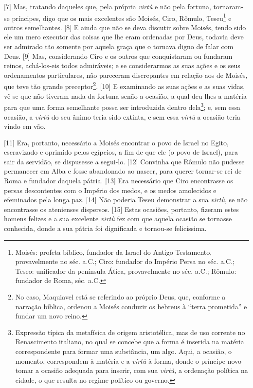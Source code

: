 {[}7{]} Mas, tratando daqueles que, pela própria \emph{virtù} e não pela
fortuna, tornaram- se príncipes, digo que os mais excelentes são Moisés,
Ciro, Rômulo, Teseu\footnote{Moisés: profeta bíblico, fundador da Israel
  do Antigo Testamento, provavelmente no séc.  a.C.; Ciro: fundador
  do Império Persa no séc.  a.C.; Teseo: unificador da península
  Ática, provavelmente no séc.  a.C.; Rômulo: fundador de Roma,
  séc. a.C.} e outros semelhantes. {[}8{]} E ainda que não se deva
discutir sobre Moisés, tendo sido ele um mero executor das coisas que
lhe eram ordenadas por Deus, todavia deve ser admirado tão somente por
aquela graça que o tornava digno de falar com Deus. {[}9{]} Mas,
considerando Ciro e os outros que conquistaram ou fundaram reinos,
achá-los-eis todos admiráveis; e se considerarmos as suas ações e os
seus ordenamentos particulares, não pareceram discrepantes em relação
aos de Moisés, que teve tão grande preceptor\footnote{No caso, Maquiavel
  está se referindo ao próprio Deus, que, conforme a narração bíblica,
  ordenou a Moisés conduzir os hebreus à ``terra prometida'' e fundar um
  novo reino.}. {[}10{]} E examinando as suas ações e as suas vidas,
vê-se que não tiveram nada da fortuna senão a ocasião, a qual deu-lhes a
matéria para que uma forma semelhante possa ser introduzida dentro
dela\footnote{Expressão típica da metafísica de origem aristotélica, mas
  de uso corrente no Renascimento italiano, no qual se concebe que a
  forma é inserida na matéria correspondente para formar uma substância,
  um algo. Aqui, a ocasião, o momento, correspondem à matéria e a
  \emph{virtù} à forma, donde o príncipe novo tomar a ocasião adequada
  para inserir, com sua \emph{virtù,} a ordenação política na cidade, o
  que resulta no regime político ou governo.}; e, sem essa ocasião, a
\emph{virtù} do seu ânimo teria sido extinta, e sem essa \emph{virtù} a
ocasião teria vindo em vão.

{[}11{]} Era, portanto, necessário a Moisés encontrar o povo de Israel
no Egito, escravizado e oprimido pelos egípcios, a fim de que ele (o
povo de Israel), para sair da servidão, se dispusesse a segui-lo.
{[}12{]} Convinha que Rômulo não pudesse permanecer em Alba e fosse
abandonado ao nascer, para querer tornar-se rei de Roma e fundador
daquela pátria. {[}13{]} Era necessário que Ciro encontrasse os persas
descontentes com o Império dos medos, e os medos amolecidos e efeminados
pela longa paz. {[}14{]} Não poderia Teseu demonstrar a sua
\emph{virtù}, se não encontrasse os atenienses dispersos. {[}15{]} Estas
ocasiões, portanto, fizeram estes homens felizes e a sua excelente
\emph{virtù} fez com que aquela ocasião se tornasse conhecida, donde a
sua pátria foi dignificada e tornou-se felicíssima.

